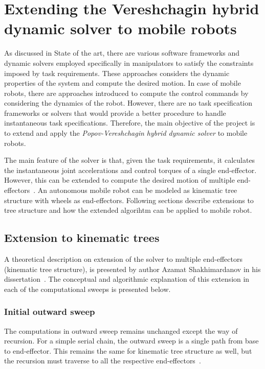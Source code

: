 
\chapter{Extending the Vereshchagin hybrid dynamic solver to mobile robots}

As discussed in State of the art, there are various software frameworks and dynamic solvers employed specifically in manipulators to satisfy the constraints imposed by task requirements. These approaches considers the dynamic properties of the system and compute the desired motion. In case of mobile robots, there are approaches introduced to compute the control commands by considering the dynamics of the robot. However, there are no task specification frameworks or solvers that would provide a better procedure to handle instantaneous task specifications. Therefore, the main objective of the project is to 
extend and apply the \textit{Popov-Vereshchagin hybrid dynamic solver} to mobile robots. 


The main feature of the solver is that, given the task requirements, it calculates the instantaneous joint accelerations and control torques of a single end-effector. However, this can be extended to compute the desired motion of multiple end-effectors~\cite{shakhimardanov2015composable}. An autonomous mobile robot can be modeled as kinematic tree structure with wheels as end-effectors. Following sections describe extensions to tree structure and how the extended algorihtm can be applied to mobile robot.


\section{Extension to kinematic trees}

A theoretical description on extension of the solver to multiple end-effectors (kinematic tree structure), is presented by author Azamat Shakhimardanov in his dissertation~\cite{shakhimardanov2015composable}. The  conceptual and algorithmic explanation of this extension in each of the computational sweeps is presented below.

\subsection{Initial outward sweep}
The computations in outward sweep remains unchanged except the way of recursion. For a simple serial chain, the outward sweep is a single path from base to end-effector. This remains the same for kinematic tree structure as well, but the recursion must traverse to all the respective end-effectors~\cite{shakhimardanov2015composable}. 

